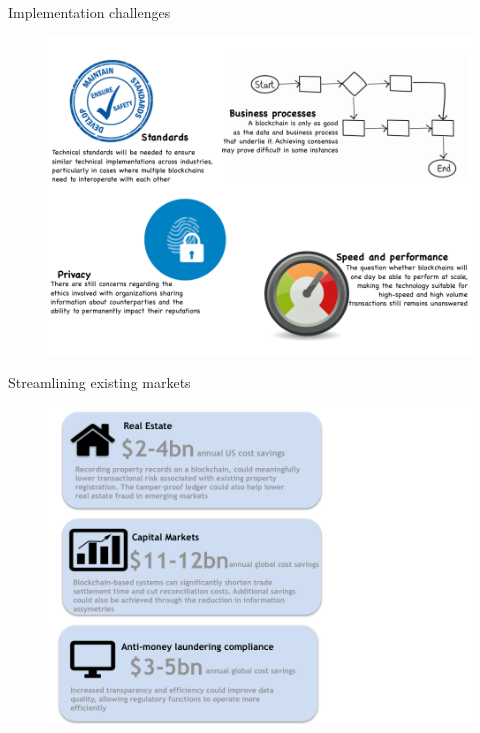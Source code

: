 \documentclass[9pt]{beamer}
\begin{document}

\begin{frame}{Implementation challenges}
	\begin{figure}[]
		\centering
		\includegraphics  [scale=0.3]{Images/implementation}
	\end{figure}
\end{frame}


\begin{frame}{Streamlining existing markets}
	\begin{figure}[]
		\centering
		\includegraphics  [scale=0.3]{Images/savings}
	\end{figure}
\end{frame}
\end{document}
